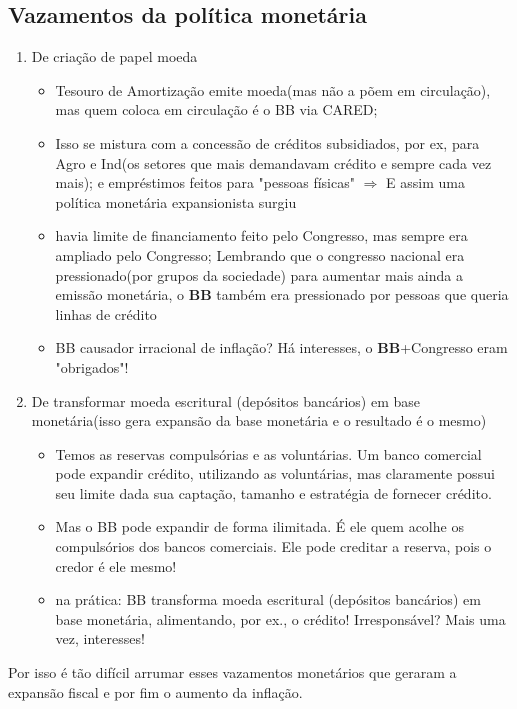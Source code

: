 \documentclass[a4paper,12pt]{article}[abntex2]
\begin{document}
\subsection{\textbf{Vazamentos da política monetária}}
\begin{enumerate}
    \item De criação de papel moeda\begin{itemize}
        \item Tesouro de Amortização emite moeda(mas não a põem em circulação), mas quem coloca em circulação é o BB via CARED; 
        \item Isso se mistura com a concessão de créditos subsidiados, por ex, para Agro e Ind(os setores que mais demandavam crédito e sempre cada vez mais); e empréstimos feitos para "pessoas físicas" $\Rightarrow$ E assim uma política monetária expansionista surgiu
        \item havia limite de financiamento feito pelo Congresso, mas sempre era ampliado pelo Congresso; Lembrando que o congresso nacional era pressionado(por grupos da sociedade) para aumentar mais ainda a emissão monetária, o \textbf{BB} também era pressionado por pessoas que queria linhas de crédito 
        \item BB causador irracional de inflação? Há interesses, o \textbf{BB}+Congresso eram "obrigados"!
    \end{itemize}
    \item De transformar moeda escritural (depósitos bancários) em base monetária(isso gera expansão da base monetária e o resultado é o mesmo) \begin{itemize}
        \item Temos as reservas compulsórias e as voluntárias. Um banco comercial pode expandir crédito, utilizando as voluntárias, mas claramente possui seu limite dada sua captação, tamanho e estratégia de fornecer crédito.
        \item Mas o BB pode expandir de forma ilimitada. É ele quem acolhe os compulsórios dos bancos comerciais. Ele pode creditar a reserva, pois o credor é ele mesmo!
        \item na prática: BB transforma moeda escritural (depósitos bancários) em base monetária, alimentando, por ex., o crédito! Irresponsável? Mais uma vez, interesses!
    \end{itemize}
\end{enumerate}

Por isso é tão difícil arrumar esses vazamentos monetários que geraram a expansão fiscal e por fim o aumento da inflação.
\end{document}
